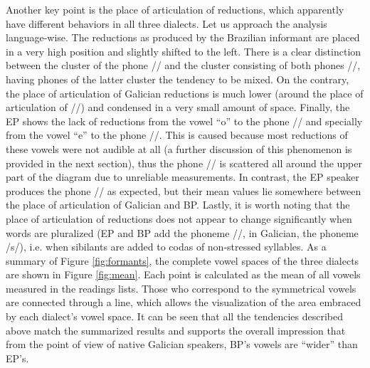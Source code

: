 \documentclass[a4paper,11pt]{article}
\begin{document}

     
     
Another key point is the place of articulation of reductions, which apparently have different behaviors in all three dialects. Let us approach the analysis language-wise. The reductions as produced by the Brazilian informant are placed in a very high position and slightly shifted to the left. There is a clear distinction between the cluster of the phone // and the cluster consisting of both phones //, having phones of the latter cluster the tendency to be mixed.  On the contrary, the place of articulation of Galician reductions is much lower (around the place of articulation of //) and condensed in a very small amount of space. Finally, the EP shows the lack of reductions from the vowel ``o'' to the phone // and specially from the vowel ``e'' to the phone //. This is caused because most reductions of these vowels were not audible at all (a further discussion of this phenomenon is provided in the next section), thus the phone // is scattered all around the upper part of the diagram due to unreliable measurements. In contrast, the EP speaker produces the phone // as expected, but their mean values lie somewhere between the place of articulation of Galician and BP. Lastly, it is worth noting that the place of articulation of reductions does not appear to change significantly when words are pluralized (EP and BP add the phoneme //, in Galician, the phoneme /s/), i.e. when sibilants are added to codas of non-stressed syllables. As a summary of Figure \ref{fig:formants}, the complete vowel spaces of the three dialects are shown in Figure \ref{fig:mean}. Each point is calculated as the mean of all vowels measured in the readings lists. Those who correspond to the symmetrical vowels are connected through a line, which allows the visualization of the area embraced by each dialect's vowel space.  It can be seen that all the tendencies described above match the summarized results and supports the overall impression that from the point of view of native Galician speakers, BP's vowels are ``wider'' than EP's.
     
     
\end{document}
